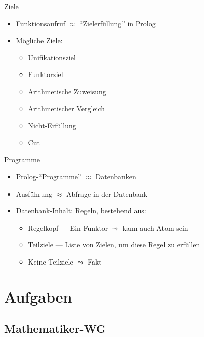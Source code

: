 \documentclass{beamer}
\newcommand{\code}[1]{
	\begin{mdframed}
		
	\end{mdframed}
}
\begin{document}
\begin{frame}{Ziele}
	\code{demos/ziele.pl}

	\begin{itemize}
		\item Funktionsaufruf $\approx$ \enquote{Zielerfüllung} in Prolog
		\item Mögliche Ziele:
		\begin{itemize}
			\item Unifikationsziel
			\item Funktorziel
			\item Arithmetische Zuweisung
			\item Arithmetischer Vergleich
			\item Nicht-Erfüllung
			\item Cut
		\end{itemize}
	\end{itemize}
\end{frame}


\begin{frame}{Programme}
	\begin{itemize}
		\item Prolog-\enquote{Programme} $\approx$ Datenbanken
		\item Ausführung $\approx$ Abfrage in der Datenbank
		\item Datenbank-Inhalt: Regeln, bestehend aus:
		\begin{itemize}
			\item Regelkopf --- Ein Funktor $\leadsto$ kann auch Atom sein
			\item Teilziele --- Liste von Zielen, um diese Regel zu erfüllen
			\item Keine Teilziele $\leadsto$ Fakt
		\end{itemize}
	\end{itemize}
\end{frame}

\section{Aufgaben}

\subsection{Mathematiker-WG}
\end{document}
